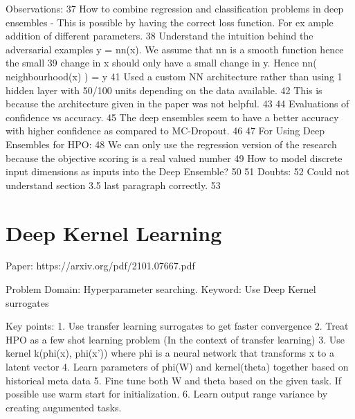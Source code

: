\documentclass[11pt]{report}
\begin{document}
 Observations:
 37    How to combine regression and classification problems in deep ensembles - This is possible by having the correct loss function. For ex    ample addition of different parameters.
 38    Understand the intuition behind the adversarial examples y = nn(x). We assume that nn is a smooth function hence the small
 39    change in x should only have a small change in y. Hence nn( neighbourhood(x) ) = y
 41    Used a custom NN architecture rather than using 1 hidden layer with 50/100 units depending on the data available.
 42    This is because the architecture given in the paper was not helpful.
 43 
 44 Evaluations of confidence vs accuracy.
 45     The deep ensembles seem to have a better accuracy with higher confidence as compared to MC-Dropout.
 46 
 47 For Using Deep Ensembles for HPO:
 48     We can only use the regression version of the research because the objective scoring is a real valued number
 49     How to model discrete input dimensions as inputs into the Deep Ensemble?
 50 
 51 Doubts:
 52     Could not understand section 3.5 last paragraph correctly.
 53 
\fi

\section{Deep Kernel Learning}

\iffalse
Paper: https://arxiv.org/pdf/2101.07667.pdf

Problem Domain: Hyperparameter searching.
Keyword: Use Deep Kernel surrogates

Key points:
    1. Use transfer learning surrogates to get faster convergence
    2. Treat HPO as a few shot learning problem (In the context of transfer learning)
    3. Use kernel k(phi(x), phi(x')) where phi is a neural network that transforms x to a latent vector
    4. Learn parameters of phi(W) and kernel(theta) together based on historical meta data
    5. Fine tune both W and theta based on the given task. If possible use warm start for initialization.
    6. Learn output range variance by creating augumented tasks.
\end{document}
